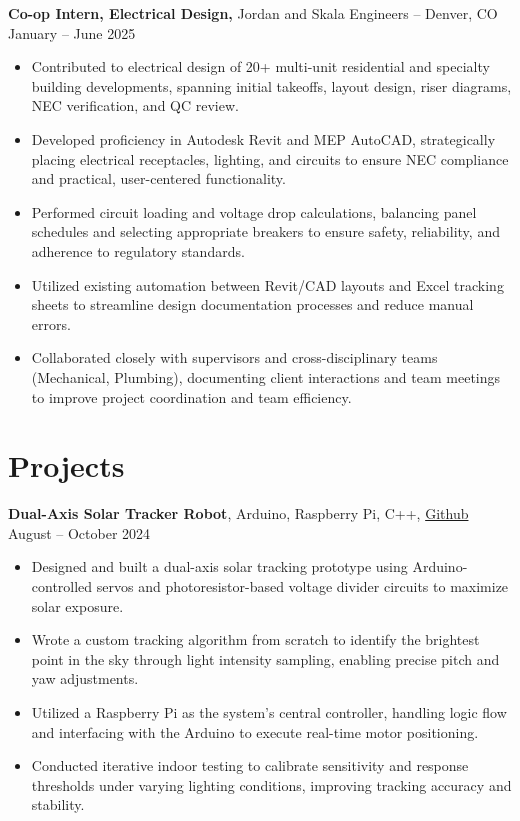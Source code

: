 \documentclass[11pt]{article}       %
\begin{document}
\textbf{Co-op Intern, Electrical Design, }{Jordan and Skala Engineers} -- Denver, CO \hfill January -- June 2025 \\
\vspace{-5pt}
\begin{itemize}
  \item Contributed to electrical design of 20+ multi-unit residential and specialty building developments, spanning initial takeoffs, layout design, riser diagrams, NEC verification, and QC review.
  \item Developed proficiency in Autodesk Revit and MEP AutoCAD, strategically placing electrical receptacles, lighting, and circuits to ensure NEC compliance and practical, user-centered functionality.
  \item Performed circuit loading and voltage drop calculations, balancing panel schedules and selecting appropriate breakers to ensure safety, reliability, and adherence to regulatory standards.
  \item Utilized existing automation between Revit/CAD layouts and Excel tracking sheets to streamline design documentation processes and reduce manual errors.
  \item Collaborated closely with supervisors and cross-disciplinary teams (Mechanical, Plumbing), documenting client interactions and team meetings to improve project coordination and team efficiency.
\end{itemize}

\vspace{-14pt}
\section{Projects}
\vspace{5pt}
\textbf{Dual-Axis Solar Tracker Robot}, Arduino, Raspberry Pi, C++, \href{https://github.com/edwardasilva/SolarPanelProject}{Github} \hfill August -- October 2024
\vspace{-5pt}
\begin{itemize}
  \item Designed and built a dual-axis solar tracking prototype using Arduino-controlled servos and photoresistor-based voltage divider circuits to maximize solar exposure.
  \item Wrote a custom tracking algorithm from scratch to identify the brightest point in the sky through light intensity sampling, enabling precise pitch and yaw adjustments.
  \item Utilized a Raspberry Pi as the system's central controller, handling logic flow and interfacing with the Arduino to execute real-time motor positioning.
  \item Conducted iterative indoor testing to calibrate sensitivity and response thresholds under varying lighting conditions, improving tracking accuracy and stability.
\end{itemize}
\end{document}
